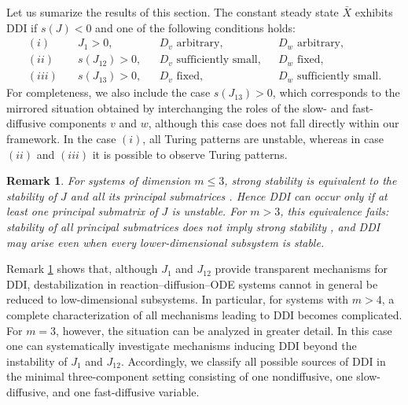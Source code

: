 \documentclass[12pt, a4paper]{amsart}
\numberwithin{equation}{section}
\newcommand{\CSS}{\bar{X}}
\newcommand{\us}{v}
\newcommand{\uf}{w}
\newtheorem{remark}[theorem]{\bf Remark}
\begin{document}
Let us sumarize the results of this section. The constant steady state $\CSS$ exhibits DDI if $s(J)<0$ and one of the following conditions holds:
\begin{equation}
\begin{aligned}
\label{eq:TwoConditionsDDI}
(i) &\quad J_1>0, && D_{\us} \text{ arbitrary,} && D_{\uf} \text{ arbitrary,} \\
(ii) &\quad s(J_{12})>0, && D_{\us} \text{ sufficiently small,} && D_{\uf} \text{ fixed}, \\
(iii) &\quad s(J_{13})>0, && D_{\us} \text{ fixed,} && D_{\uf} \text{ sufficiently small.}
\end{aligned}
\end{equation}
For completeness, we also include the case $s(J_{13})>0$, which
corresponds to the mirrored situation obtained by interchanging the
roles of the slow- and fast-diffusive components $v$ and $w$, although
this case does not fall directly within our framework.
In the case $(i)$, all Turing patterns are unstable, whereas in case $(ii)$ and $(iii)$ it is possible to observe Turing patterns.

\begin{remark}\label{rem:DimN}
For systems of dimension \(m \leqslant 3\), strong stability is equivalent to
the stability of \(J\) and all its principal submatrices
\cite[Theorems~3--4]{Cross}. Hence DDI can occur only if at least one
principal submatrix of \(J\) is unstable. For \(m>3\), this equivalence
fails: stability of all principal submatrices does not imply strong
stability \cite[Example~3.1]{Satnoianu}, and DDI may arise even when
every lower-dimensional subsystem is stable.
\end{remark}

Remark \ref{rem:DimN} shows that, although $J_1$ and $J_{12}$ provide
transparent mechanisms for DDI,
destabilization in reaction--diffusion--ODE systems cannot in general
be reduced to low-dimensional subsystems. In particular, for systems
with $m>4$, a complete characterization of all mechanisms leading to
DDI becomes complicated. For $m=3$, however, the situation can be analyzed in greater detail.
In this case one can systematically investigate mechanisms inducing
DDI beyond the instability of $J_1$ and $J_{12}$. Accordingly, we classify all possible sources of
DDI in the minimal three-component setting
consisting of one nondiffusive, one slow-diffusive, and one
fast-diffusive variable.
\end{document}
